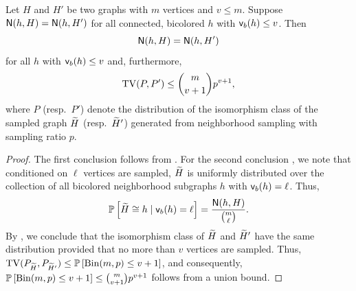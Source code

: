 \begin{lemma} \label{lmm:counts}
Let $ H $ and $ H' $ be two graphs with $m$ vertices and $v \leq m$. 
Suppose $ {\mathsf{N}}(h, H) = {\mathsf{N}}(h, H') $ for all connected, bicolored $ h $ with $ {\mathsf{v}}_b(h) \leq v $. Then 
\begin{equation} \label{eq:match}
{\mathsf{N}}(h, H) = {\mathsf{N}}(h, H')
\end{equation}
for all $ h $ with $ {\mathsf{v}}_b(h) \leq v $ and, furthermore,
\begin{equation} \label{eq:tv-bound}
{\rm TV}(P,P') \leq \binom{m}{v+1} p^{v+1},
\end{equation}
where $P$ (resp.~$P'$) denote the distribution of the isomorphism class of the sampled graph ${\widetilde{H}}$ (resp.~${\widetilde{H}}'$) generated from neighborhood sampling with sampling ratio $p$.
\end{lemma}

\begin{proof}
The first conclusion  follows from . For the second conclusion , we note that conditioned on $ \ell $ vertices are sampled, $ {\widetilde{H}} $ is uniformly distributed over the collection of all bicolored neighborhood subgraphs $ h $ with $ {\mathsf{v}}_b(h) = \ell $. Thus,
\begin{equation*}
\mathbb{P}\left[{\widetilde{H}} \cong h \mid {\mathsf{v}}_b(h) = \ell\right] = \frac{{\mathsf{N}}(h, H)}{\binom{m}{\ell}}.
\end{equation*}
By , we conclude that the isomorphism class of $ {\widetilde{H}} $ and $ {\widetilde{H}}' $ have the same distribution provided that no more than $ v $ vertices are sampled. Thus, $ {\rm TV}(P_{{\widetilde{H}}},P_{{\widetilde{H}}'}) \leq \mathbb{P}\left[\mathrm{Bin}(m, p) \leq v+1\right] $, and consequently, $ \mathbb{P}\left[\mathrm{Bin}(m, p) \leq v+1\right] \leq \binom{m}{v+1}p^{v+1} $ follows from a union bound.
\end{proof}

